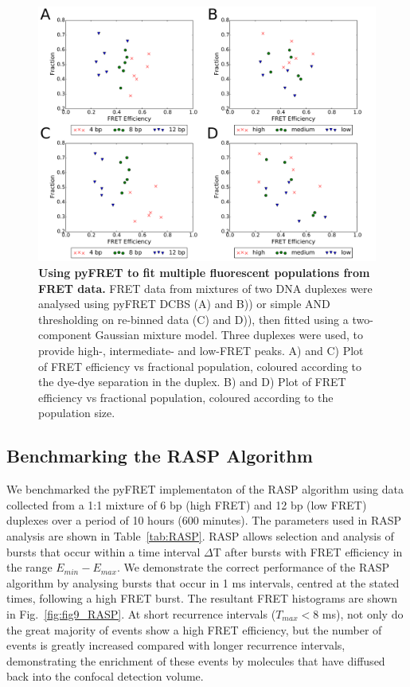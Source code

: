 \begin{figure}[!ht]
   \begin{center}
      \includegraphics*[clip=true, width=6in]{pyFRET/ratios_FRET.pdf}
      \caption{{\bf Using pyFRET to fit multiple fluorescent populations from FRET data.} FRET data from mixtures of two DNA duplexes were analysed using pyFRET DCBS (A) and B)) or simple AND thresholding on re-binned data (C) and D)), then fitted using a two-component Gaussian mixture model. Three duplexes were used, to provide high-, intermediate- and low-FRET peaks. A) and C) Plot of FRET efficiency vs fractional population, coloured according to the dye-dye separation in the duplex. B) and D) Plot of FRET efficiency vs fractional population, coloured according to the population size.}
      \label{fig:ratios_FRET}
   \end{center}
\end{figure}

\clearpage

\subsection{Benchmarking the RASP Algorithm}    
We benchmarked the pyFRET implementaton of the RASP algorithm using data collected from a 1:1 mixture of 6 bp (high FRET) and 12 bp (low FRET) duplexes over a period of 10 hours (600 minutes). The parameters used in RASP analysis are shown in Table~\ref{tab:RASP}. RASP allows selection and analysis of bursts that occur within a time interval $\Delta$T after bursts with FRET efficiency in the range $E_{min} - E_{max}$. We demonstrate the correct performance of the RASP algorithm by analysing bursts that occur in 1 ms intervals, centred at the stated times, following a high FRET burst. The resultant FRET histograms are shown in Fig.~\ref{fig:fig9_RASP}. At short recurrence intervals ($T_{max} < 8$ ms), not only do the great majority of events show a high FRET efficiency, but the number of events is greatly increased compared with longer recurrence intervals, demonstrating the enrichment of these events by molecules that have diffused back into the confocal detection volume. 


